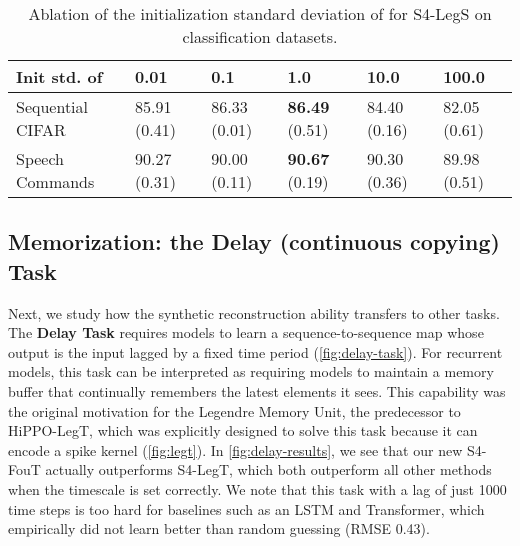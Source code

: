 \documentclass{article}
\begin{document}
\begin{table}[!t]
  \caption{Ablation of the initialization standard deviation of  for S4-LegS on classification datasets.}
  \centering
  \begin{tabular}{@{}llllll@{}}
    \toprule
    Init std.  of  & 0.01         & 0.1          & 1.0                   & 10.0         & 100.0        \\
    \midrule
    Sequential CIFAR                       & 85.91 (0.41) & 86.33 (0.01) & \textbf{86.49} (0.51) & 84.40 (0.16) & 82.05 (0.61) \\
    Speech Commands                        & 90.27 (0.31) & 90.00 (0.11) & \textbf{90.67} (0.19) & 90.30 (0.36) & 89.98 (0.51) \\
    \bottomrule
  \end{tabular}
  \label{tab:init-std}
\end{table}



\subsection{Memorization: the Delay (continuous copying) Task}
\label{sec:experiments:delay}

Next, we study how the synthetic reconstruction ability transfers to other tasks.
The \textbf{Delay Task} requires models to learn a sequence-to-sequence map whose output is the input lagged by a fixed time period (\cref{fig:delay-task}).
For recurrent models, this task can be interpreted as requiring models to maintain a memory buffer that continually remembers the latest elements it sees.
This capability was the original motivation for the Legendre Memory Unit, the predecessor to HiPPO-LegT, which was explicitly designed to solve this task because it can encode a spike kernel (\cref{fig:legt}).
In \cref{fig:delay-results}, we see that our new S4-FouT actually outperforms S4-LegT,
which both outperform all other methods when the timescale  is set correctly.
We note that this task with a lag of just 1000 time steps is too hard for baselines such as an LSTM and Transformer, which empirically did not learn better than random guessing (RMSE 0.43).
\end{document}
